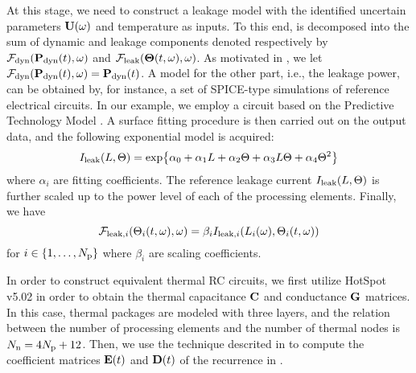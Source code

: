 At this stage, we need to construct a leakage model with the identified uncertain parameters $\mathbf{U}(\omega)$ and temperature as inputs. To this end,  is decomposed into the sum of dynamic and leakage components denoted respectively by $\mathcal{F}_{\text{dyn}}(\mathbf{P}_{\text{dyn}}(t), \omega)$ and $\mathcal{F}_{\text{leak}}({\boldsymbol\Theta}(t, \omega), \omega)$. As motivated in , we let $\mathcal{F}_{\text{dyn}}(\mathbf{P}_{\text{dyn}}(t), \omega) = \mathbf{P}_{\text{dyn}}(t)$. A model for the other part, i.e., the leakage power, can be obtained by, for instance, a set of SPICE-type simulations of reference electrical circuits. In our example, we employ a circuit based on the Predictive Technology Model \cite{ptm}. A surface fitting procedure is then carried out on the output data, and the following exponential model is acquired:
\begin{equation} \elabel{leakage-current}
  I_\leak(\Leff, \T) = \text{exp} \big\{ \alpha_0 + \alpha_1 \Leff + \alpha_2 \T + \alpha_3 \Leff \T + \alpha_4 \T^2 \big\}
\end{equation}
where $\alpha_i$ are fitting coefficients. The reference leakage current $I_{\text{leak}}(L, \Theta)$ is further scaled up to the power level of each of the processing elements. Finally, we have
\[
  \mathcal{F}_{\text{leak}, i}(\Theta_i(t, \omega), \omega) = \beta_i I_{\text{leak}, i}(L_i(\omega), \Theta_i(t, \omega))
\]
for $i \in \{ 1, \dotsc, {N_\text{p}} \}$ where $\beta_i$ are scaling coefficients.

In order to construct equivalent thermal RC circuits, we first utilize HotSpot v5.02 \cite{hotspot} in order to obtain the thermal capacitance $\mC$ and conductance $\mG$ matrices. In this case, thermal packages are modeled with three layers, and the relation between the number of processing elements and the number of thermal nodes is $N_\text{n} = 4 {N_\text{p}} + 12$. Then, we use the technique descrited in \cite{ukhov2012} to compute the coefficient matrices $\mE(\t)$ and $\mD(\t)$ of the recurrence in .
